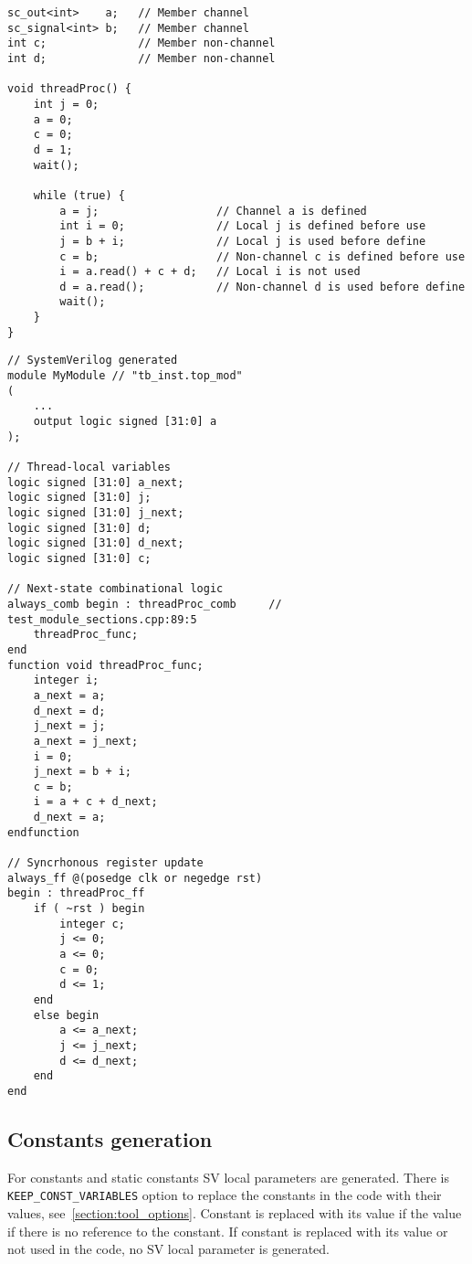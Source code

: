 \begin{lstlisting}[style=mycpp]
sc_out<int>    a;   // Member channel
sc_signal<int> b;   // Member channel
int c;              // Member non-channel
int d;              // Member non-channel

void threadProc() {
    int j = 0;          
    a = 0;
    c = 0;
    d = 1;
    wait();

    while (true) {
        a = j;                  // Channel a is defined
        int i = 0;              // Local j is defined before use
        j = b + i;              // Local j is used before define
        c = b;                  // Non-channel c is defined before use
        i = a.read() + c + d;   // Local i is not used
        d = a.read();           // Non-channel d is used before define
        wait();
    }
}
\end{lstlisting}
%
\begin{lstlisting}[style=myverilog]
// SystemVerilog generated
module MyModule // "tb_inst.top_mod"
(
    ...
    output logic signed [31:0] a
);

// Thread-local variables
logic signed [31:0] a_next;
logic signed [31:0] j;
logic signed [31:0] j_next;
logic signed [31:0] d;
logic signed [31:0] d_next;
logic signed [31:0] c;

// Next-state combinational logic
always_comb begin : threadProc_comb     // test_module_sections.cpp:89:5
    threadProc_func;
end
function void threadProc_func;
    integer i;
    a_next = a;
    d_next = d;
    j_next = j;
    a_next = j_next;
    i = 0;
    j_next = b + i;
    c = b;
    i = a + c + d_next;
    d_next = a;
endfunction

// Syncrhonous register update
always_ff @(posedge clk or negedge rst) 
begin : threadProc_ff
    if ( ~rst ) begin
        integer c;
        j <= 0;
        a <= 0;
        c = 0;
        d <= 1;
    end
    else begin
        a <= a_next;
        j <= j_next;
        d <= d_next;
    end
end
\end{lstlisting}


\subsection{Constants generation}\label{section:const_gen}

For constants and static constants SV local parameters are generated. There is {\tt KEEP\_CONST\_VARIABLES} option to replace the constants in the code with their values, see~\ref{section:tool_options}. Constant is replaced with its value if the value if there is no reference to the constant. If constant is replaced with its value or not used in the code, no SV local parameter is generated.

